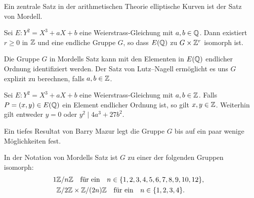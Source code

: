 Ein zentrale Satz in der arithmetischen Theorie elliptische Kurven ist
der Satz von Mordell.

\begin{satz}[Mordell (1922)]\label{satz:mordell}
  Sei $E:Y^2 = X^3+aX+b$ eine
  Weierstrass-Gleichung mit $a,b\in{\mathbb{Q}}$. Dann existiert $r\ge 0$ in
  ${\mathbb{Z}}$ und eine endliche Gruppe $G$, so dass
  $E({\mathbb{Q}})$ zu $G\times {\mathbb{Z}}^r$ isomorph ist.
\end{satz}

Die Gruppe $G$ in Mordells Satz kann mit den Elementen in $E({\mathbb{Q}})$
endlicher Ordnung identifiziert werden. Der Satz von Lutz--Nagell
ermöglicht es uns $G$ explizit zu berechnen, falls $a,b\in{\mathbb{Z}}$.

\begin{satz}
  \label{satz:ln}
  Sei $E:Y^2=X^3+aX+b$ eine Weierstrass-Gleichung mit $a,b\in{\mathbb{Z}}$.
  Falls $ P =(x,y)\in E({\mathbb{Q}})$ ein Element endlicher Ordnung ist, so
  gilt $x,y\in{\mathbb{Z}}$. Weiterhin gilt entweder $y=0$ oder $y^2 \mid
  4a^3+27b^2$. 
\end{satz}


Ein tiefes Resultat von Barry Mazur legt die Gruppe $G$ bis auf ein
paar wenige Möglichkeiten fest.

\begin{satz}[Mazur (1978)] 
  In der Notation von Mordells Satz ist $G$ zu einer der folgenden
  Gruppen isomorph:
  \begin{alignat*}1
    &\IZ/n\IZ \quad\text{für ein}\quad n\in
    \{1,2,3,4,5,6,7,8,9,10,12\},\\
    &\IZ/2\IZ\times\IZ/(2n)\IZ \quad\text{für ein}\quad n\in\{1,2,3,4\}.\\
  \end{alignat*}
\end{satz}


